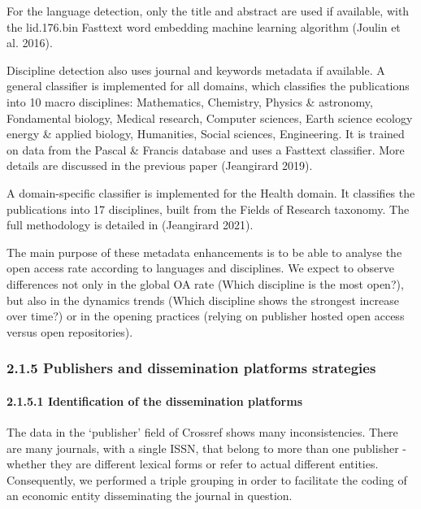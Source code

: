 \documentclass[
]{article}
\begin{document}
For the language detection, only the title and abstract are used if
available, with the lid.176.bin Fasttext word embedding machine learning
algorithm (Joulin et al. 2016).

Discipline detection also uses journal and keywords metadata if
available. A general classifier is implemented for all domains, which
classifies the publications into 10 macro disciplines: Mathematics,
Chemistry, Physics \& astronomy, Fondamental biology, Medical research,
Computer sciences, Earth science ecology energy \& applied biology,
Humanities, Social sciences, Engineering. It is trained on data from the
Pascal \& Francis database and uses a Fasttext classifier. More details
are discussed in the previous paper (Jeangirard 2019).

A domain-specific classifier is implemented for the Health domain. It
classifies the publications into 17 disciplines, built from the Fields
of Research taxonomy. The full methodology is detailed in (Jeangirard
2021).

The main purpose of these metadata enhancements is to be able to analyse
the open access rate according to languages and disciplines. We expect
to observe differences not only in the global OA rate (Which discipline
is the most open?), but also in the dynamics trends (Which discipline
shows the strongest increase over time?) or in the opening practices
(relying on publisher hosted open access versus open repositories).

\hypertarget{publishers-and-dissemination-platforms-strategies}{%
\subsubsection{2.1.5 Publishers and dissemination platforms
strategies}\label{publishers-and-dissemination-platforms-strategies}}

\hypertarget{identification-of-the-dissemination-platforms}{%
\paragraph{2.1.5.1 Identification of the dissemination
platforms}\label{identification-of-the-dissemination-platforms}}

The data in the `publisher' field of Crossref shows many
inconsistencies. There are many journals, with a single ISSN, that
belong to more than one publisher - whether they are different lexical
forms or refer to actual different entities. Consequently, we performed
a triple grouping in order to facilitate the coding of an economic
entity disseminating the journal in question.
\end{document}
